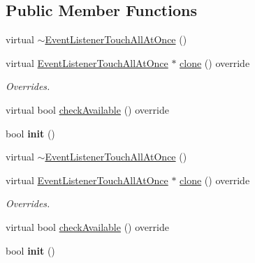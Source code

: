 \subsection*{Public Member Functions}
\begin{DoxyCompactItemize}
\item 
virtual \hyperlink{classEventListenerTouchAllAtOnce_aab17a8eb01a1e36240f83a7410bfc343}{$\sim$\+Event\+Listener\+Touch\+All\+At\+Once} ()
\item 
\mbox{\label{classEventListenerTouchAllAtOnce_ab746dbbce44cceb3916ba7a81be36ede}} 
virtual \hyperlink{classEventListenerTouchAllAtOnce}{Event\+Listener\+Touch\+All\+At\+Once} $\ast$ \hyperlink{classEventListenerTouchAllAtOnce_ab746dbbce44cceb3916ba7a81be36ede}{clone} () override
\begin{DoxyCompactList}\small\item\em Overrides. \end{DoxyCompactList}\item 
virtual bool \hyperlink{classEventListenerTouchAllAtOnce_a2bae6413f00f5afbe6dfc39985ec76cf}{check\+Available} () override
\item 
\mbox{\label{classEventListenerTouchAllAtOnce_ae87fa0b09263816e8feef0251d38fc7e}} 
bool {\bfseries init} ()
\item 
virtual \hyperlink{classEventListenerTouchAllAtOnce_a57b3cf4639ca1b3903c76cb3d2889307}{$\sim$\+Event\+Listener\+Touch\+All\+At\+Once} ()
\item 
\mbox{\label{classEventListenerTouchAllAtOnce_a0b2fd9403e7ea1548ad3ccc54270df4f}} 
virtual \hyperlink{classEventListenerTouchAllAtOnce}{Event\+Listener\+Touch\+All\+At\+Once} $\ast$ \hyperlink{classEventListenerTouchAllAtOnce_a0b2fd9403e7ea1548ad3ccc54270df4f}{clone} () override
\begin{DoxyCompactList}\small\item\em Overrides. \end{DoxyCompactList}\item 
virtual bool \hyperlink{classEventListenerTouchAllAtOnce_aa694c16160c353ed089ab1b80b003066}{check\+Available} () override
\item 
\mbox{\label{classEventListenerTouchAllAtOnce_ae87fa0b09263816e8feef0251d38fc7e}} 
bool {\bfseries init} ()
\end{DoxyCompactItemize}
